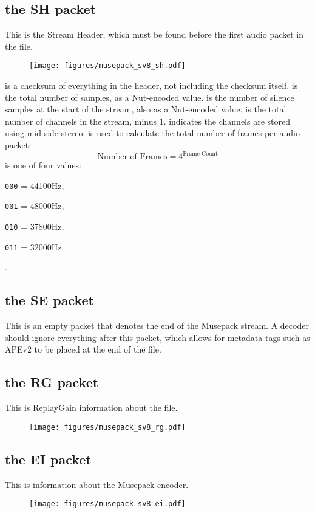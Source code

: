 \subsection{the SH packet}
This is the Stream Header, which must be found before the first
audio packet in the file.
\begin{figure}[h]
\texttt{[image: figures/musepack\_sv8\_sh.pdf]}
\end{figure}
\par
\noindent
{} is a checksum of everything in the header, not including the
checksum itself.
 is the total number of samples, as a Nut-encoded value.
 is the number of silence samples at the start
of the stream, also as a Nut-encoded value.
 is the total number of channels in the stream, minus 1.
 indicates the channels are stored using mid-side stereo.
 is used to calculate the total number of frames per
audio packet:
\begin{equation}
\text{Number of Frames} = 4 ^ \text{Frame Count}
\end{equation}
 is one of four values:

\begin{inparaenum}
\item[\texttt{000} = ] 44100Hz,
\item[\texttt{001} = ] 48000Hz,
\item[\texttt{010} = ] 37800Hz,
\item[\texttt{011} = ] 32000Hz
\end{inparaenum}
.

\subsection{the SE packet}
This is an empty packet that denotes the end of the Musepack stream.
A decoder should ignore everything after this packet, which allows
for metadata tags such as APEv2 to be placed at the end of the file.

\subsection{the RG packet}
This is ReplayGain information about the file.
\begin{figure}[h]
\texttt{[image: figures/musepack\_sv8\_rg.pdf]}
\end{figure}

\subsection{the EI packet}
This is information about the Musepack encoder.
\begin{figure}[h]
\texttt{[image: figures/musepack\_sv8\_ei.pdf]}
\end{figure}
